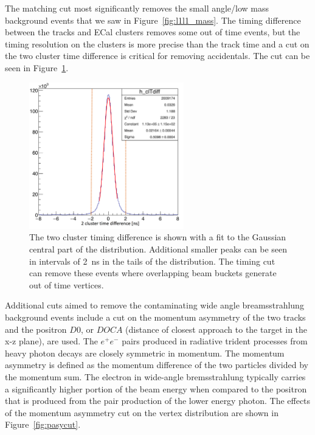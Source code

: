 The matching cut most significantly removes the small angle/low mass background events that we saw in Figure~\ref{fig:l1l1_mass}. The timing difference between the tracks and ECal clusters removes some out of time events, but the timing resolution on the clusters is more precise than the track time and a cut on the two cluster time difference is critical for removing accidentals. The cut can be seen in Figure~\ref{fig:cltdiff}.

\begin{figure}[htb]
  \centering
      \includegraphics[width=0.6\textwidth]{pics/searching/cltdiff.png}
  \caption[Cut on the cluster pair time difference]{The two cluster timing difference is shown with a fit to the Gaussian central part of the distribution. Additional smaller peaks can be seen in intervals of 2~ns in the tails of the distribution. The timing cut can remove these events where overlapping beam buckets generate out of time vertices.}
  \label{fig:cltdiff}
\end{figure} 

Additional cuts aimed to remove the contaminating wide angle breamsstrahlung background events include a cut on the momentum asymmetry of the two tracks and the positron $D0$, or $DOCA$ (distance of closest approach to the target in the x-z plane), are used. The $e^+e^-$ pairs produced in radiative trident processes from heavy photon decays are closely symmetric in momentum. The momentum asymmetry is defined as the momentum difference of the two particles divided by the momentum sum. The electron in wide-angle bremsstrahlung typically carries a significantly higher portion of the beam energy when compared to the positron that is produced from the pair production of the lower energy photon. The effects of the momentum asymmetry cut on the vertex distribution are shown in Figure~\ref{fig:pasycut}.

